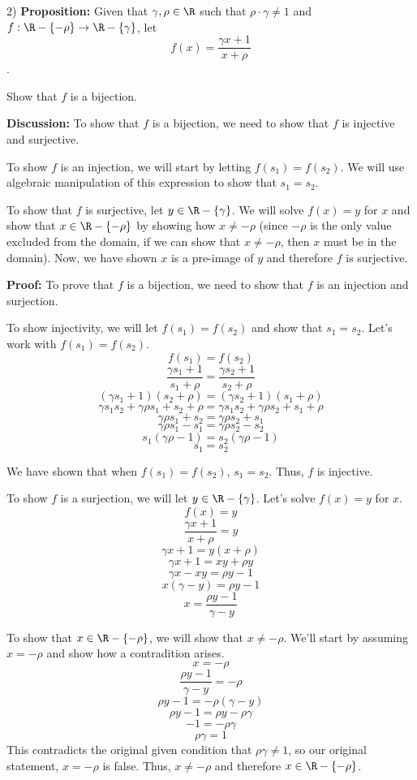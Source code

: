     \begin{paragraph}{2)}    
    \textbf{Proposition:} Given that $\gamma, \rho \in \R$ such that $\rho \cdot \gamma \neq 1$
    and $f: \R - \{-\rho\} \rightarrow \R - \{\gamma\}$, let $$f(x) = \frac{\gamma x + 1}{x + \rho}$$.
    
    Show that $f$ is a bijection.
    
    \spacing
    
    \textbf{Discussion:} To show that $f$ is a bijection, we need to show that $f$ is injective and surjective.

    To show $f$ is an injection, we will start by letting $f(s_1) = f(s_2)$.
    We will use algebraic manipulation of this expression to show that $s_1 = s_2$.
    \spacing

    
    To show that $f$ is surjective, let $y \in \R - \{\gamma\}$. We will solve $f(x) = y$ for $x$
    and show that $x \in \R - \{-\rho\}$ by showing how $x \neq -\rho$ (since $-\rho$ is the only
    value excluded from the domain, if we can show that $x \neq -\rho$, then $x$ must be in 
    the domain). Now, we have shown $x$ is a pre-image of $y$ and therefore $f$ is surjective.
    \spacing

    \textbf{Proof:} To prove that $f$ is a bijection, we need to show that $f$ is an injection and surjection.
    \spacing

    To show injectivity, we will let $f(s_1) = f(s_2)$ and show that $s_1 = s_2$.
    Let's work with $f(s_1) = f(s_2)$.
    $$f(s_1) = f(s_2)$$
    $$\frac{\gamma s_1 + 1}{s_1 + \rho} = \frac{\gamma s_2 + 1}{s_2 + \rho}$$
    $$(\gamma s_1 + 1)(s_2 + \rho) = (\gamma s_2 + 1)(s_1 + \rho)$$
    $$\gamma s_1 s_2 + \gamma\rho s_1 + s_2 + \rho = \gamma s_1 s_2 + \gamma\rho s_2 + s_1 + \rho$$
    $$\gamma\rho s_1 + s_2 = \gamma\rho s_2 + s_1$$
    $$\gamma\rho s_1 - s_1 = \gamma\rho s_2 - s_2$$
    $$s_1 (\gamma\rho - 1) = s_2 (\gamma\rho - 1)$$
    $$s_1 = s_2$$

    We have shown that when $f(s_1) = f(s_2)$, $s_1 = s_2$. Thus,
    $f$ is injective.
    \spacing

    To show $f$ is a surjection, we will let $y \in \R - \{\gamma\}$.
    Let's solve $f(x) = y$ for $x$.
    $$f(x) = y$$
    $$\frac{\gamma x + 1}{x + \rho} = y$$
    $$\gamma x + 1 = y(x + \rho)$$
    $$\gamma x + 1 = xy + \rho y$$
    $$\gamma x - xy = \rho y - 1$$
    $$x (\gamma - y) = \rho y - 1$$
    $$x = \frac{\rho y - 1}{\gamma - y}$$

    To show that $x \in \R - \{-\rho\}$, we will show that $x \neq -\rho$. We'll start by 
    assuming $x = -\rho$ and show how a contradition arises.
    $$x = -\rho$$
    $$\frac{\rho y - 1}{\gamma - y} = -\rho$$
    $$\rho y - 1 = -\rho(\gamma - y)$$
    $$\rho y - 1 = \rho y - \rho\gamma $$
    $$-1 = -\rho\gamma$$
    $$\rho\gamma = 1$$
    This contradicts the original given condition that $\rho\gamma \neq 1$, so our 
    original statement, $x = -\rho$ is false. Thus, $x \neq -\rho$ and therefore
    $x \in \R - \{-\rho\}$.
    \spacing


\end{paragraph}
